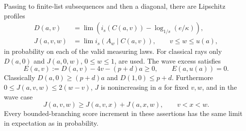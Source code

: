 \begin{proposition}[Profiles]\label{prop:rt-profiles}
Passing to finite-list subsequences and then a diagonal, there are
Lipschitz profiles
\begin{equation}
 \begin{split}
 D(a,v)&=\lim\left(i_s(C(a,v))-
                              \log_{1/s}(e/\kappa)\right),\\
 J(a,v,w)&=\lim i_s(A_w\mid C(a,v)),\qquad v\le w\le u(a),
 \end{split}
 \tag{prof}\label{eq:prof}
\end{equation}
in probability on each of the valid measuring laws.  For classical
rays only $D(a,0)$ and $J(a,0,w)$, $0\le w\le1$, are used.
The wave excess satisfies
\begin{equation}
 E(a,v):=D(a,v)-4v-(p+d)a\ge0,
 \qquad E(a,u(a))=0.
 \tag{excess}\label{eq:excess}
\end{equation}
Classically $D(a,0)\ge(p+d)a$ and $D(1,0)\le p+d$.
Furthermore $0\le J(a,v,w)\le2(w-v)$, $J$ is nonincreasing in
$a$ for fixed $v,w$, and in the wave case
\begin{equation}\label{eq:rt-superadditive}
 J(a,v,w)\ge J(a,v,x)+J(a,x,w),\qquad v<x<w.
\end{equation}
Every bounded-branching score increment in these assertions has the
same limit in expectation as in probability.
\end{proposition}

